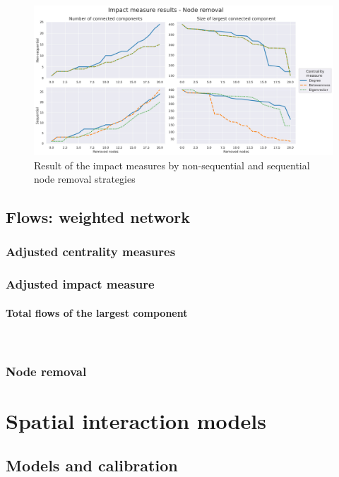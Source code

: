 \documentclass{article}
\begin{document}
\begin{figure}[htp]
    \centering
    \includegraphics[width=15cm]{Results_Impact_Measures_Total.jpg}
    \caption{Result of the impact measures by non-sequential and sequential node removal strategies}
    \label{fig:impact_results}
\end{figure}

\subsection{Flows: weighted network}

\subsubsection{Adjusted centrality measures}

\subsubsection{Adjusted impact measure}

\paragraph{Total flows of the largest component}\mbox{}\\



\subsubsection{Node removal}

\section{Spatial interaction models}


\subsection{Models and calibration}
\end{document}
